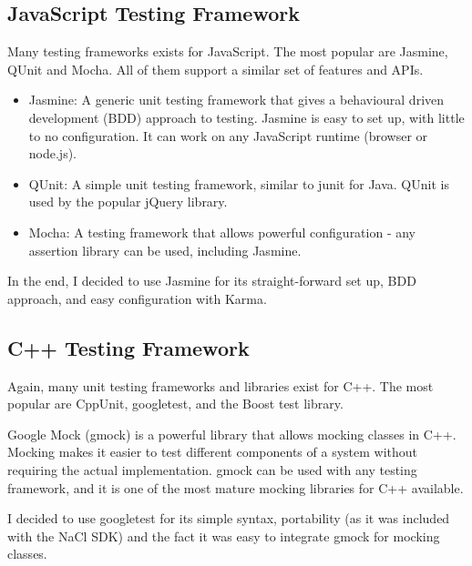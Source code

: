 
\subsection{JavaScript Testing Framework} %
\label{sub:js_test_framework}
Many testing frameworks exists for JavaScript. The most popular are Jasmine\cite{jasminetest}, QUnit\cite{qunittest} and Mocha\cite{mochatest}. All of them support a similar set of features and APIs. 

\begin{itemize}
	\item Jasmine: A generic unit testing framework that gives a behavioural driven development (BDD) approach to testing. Jasmine is easy to set up, with little to no configuration. It can work on any JavaScript runtime (browser or node.js).
	\item QUnit: A simple unit testing framework, similar to junit for Java. QUnit is used by the popular jQuery library. 
	\item Mocha: A testing framework that allows powerful configuration - any assertion library can be used, including Jasmine.
\end{itemize}

In the end, I decided to use Jasmine for its straight-forward set up, BDD approach, and easy configuration with Karma.


\subsection{C++ Testing Framework} %
\label{sub:cpp_testing}
Again, many unit testing frameworks and libraries exist for C++. The most popular are CppUnit, googletest, and the Boost test library.

Google Mock (gmock) is a powerful library that allows mocking classes in C++. Mocking makes it easier to test different components of a system without requiring the actual implementation. gmock can be used with any testing framework, and it is one of the most mature mocking libraries for C++ available.

I decided to use googletest for its simple syntax, portability (as it was included with the NaCl SDK) and the fact it was easy to integrate gmock for mocking classes.


